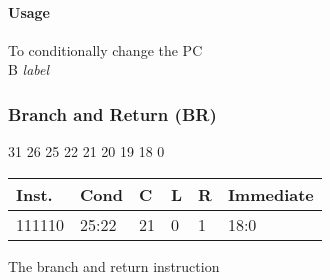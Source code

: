 \documentclass[12pt]{article}
\begin{document}
    \paragraph{Usage}
    \begin{flushleft}
    To conditionally change the PC \\
    \vspace{1em}
    B \textit{label} 
    \end{flushleft}


\newpage
\subsubsection{Branch and Return (BR)}
    
    \hspace{1.6cm}31 \hspace{1.15cm}26 \hspace{.05cm}25 \hspace{.8cm}22 \hspace{.1cm}21 \hspace{.2cm}20 \hspace{.2cm}19 \hspace{.1cm}18 \hspace{6.1cm}0
    \vspace{-.25cm}
    \begin{center}
        \begin{tabular}{ |p{1.8cm}|p{1.5cm}|p{.3cm}|p{.3cm}|p{.3cm}|p{6.5cm}| }
            \hline
            \textbf{Inst.} & \textbf{Cond} &  \textbf{C} & \textbf{L}&\textbf{R}&\textbf{Immediate}\\
            \hline
            111110& 25:22 & 21 & 0 & 1 &18:0\\
            \hline
        \end{tabular}
    \end{center}
    
    \noindent
    The branch and return instruction
    
\end{document}
